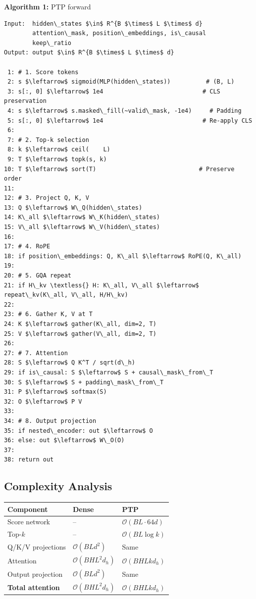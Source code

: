 \textbf{Algorithm 1:} PTP forward
\begin{lstlisting}
Input:  hidden\_states $\in$ R^{B $\times$ L $\times$ d}
        attention\_mask, position\_embeddings, is\_causal
        keep\_ratio  
Output: output $\in$ R^{B $\times$ L $\times$ d}

 1: # 1. Score tokens
 2: s $\leftarrow$ sigmoid(MLP(hidden\_states))          # (B, L)
 3: s[:, 0] $\leftarrow$ 1e4                            # CLS preservation
 4: s $\leftarrow$ s.masked\_fill(~valid\_mask, -1e4)     # Padding
 5: s[:, 0] $\leftarrow$ 1e4                            # Re-apply CLS
 6:
 7: # 2. Top-k selection
 8: k $\leftarrow$ ceil(    L)
 9: T $\leftarrow$ topk(s, k)
10: T $\leftarrow$ sort(T)                             # Preserve order
11:
12: # 3. Project Q, K, V
13: Q $\leftarrow$ W\_Q(hidden\_states)
14: K\_all $\leftarrow$ W\_K(hidden\_states)
15: V\_all $\leftarrow$ W\_V(hidden\_states)
16:
17: # 4. RoPE
18: if position\_embeddings: Q, K\_all $\leftarrow$ RoPE(Q, K\_all)
19:
20: # 5. GQA repeat
21: if H\_kv \textless{} H: K\_all, V\_all $\leftarrow$ repeat\_kv(K\_all, V\_all, H/H\_kv)
22:
23: # 6. Gather K, V at T
24: K $\leftarrow$ gather(K\_all, dim=2, T)
25: V $\leftarrow$ gather(V\_all, dim=2, T)
26:
27: # 7. Attention
28: S $\leftarrow$ Q K^T / sqrt(d\_h)
29: if is\_causal: S $\leftarrow$ S + causal\_mask\_from\_T
30: S $\leftarrow$ S + padding\_mask\_from\_T
31: P $\leftarrow$ softmax(S)
32: O $\leftarrow$ P V
33:
34: # 8. Output projection
35: if nested\_encoder: out $\leftarrow$ O
36: else: out $\leftarrow$ W\_O(O)
37:
38: return out
\end{lstlisting}

\subsection{Complexity Analysis}

\begin{table}[H]
\centering
\small
\begin{tabular}{lll}
\toprule
\textbf{Component} & \textbf{Dense} & \textbf{PTP} \\
\midrule
Score network & -- & $\mathcal{O}(B L \cdot 64 d)$ \\
Top-$k$ & -- & $\mathcal{O}(B L \log k)$ \\
Q/K/V projections & $\mathcal{O}(B L d^2)$ & Same \\
Attention & $\mathcal{O}(B H L^2 d_h)$ & \textbf{$\mathcal{O}(B H L k d_h)$} \\
Output projection & $\mathcal{O}(B L d^2)$ & Same \\
\textbf{Total attention} & $\mathcal{O}(B H L^2 d_h)$ & \textbf{$\mathcal{O}(B H L k d_h)$} \\
\bottomrule
\end{tabular}
\end{table}

